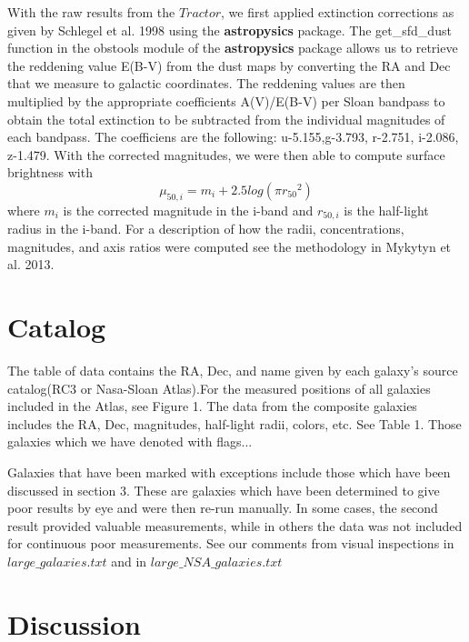 \documentclass[12pt,preprint,pdftex]{aastex}
\begin{document}
With the raw results from the $Tractor$, we first applied extinction corrections as given by Schlegel et al. 1998 using the \textbf{astropysics} package. The get_sfd_dust function in the obstools module of the {\bf astropysics} package allows us to retrieve the reddening value E(B-V) from the dust maps by converting the RA and Dec that we measure to galactic coordinates. The reddening values are then multiplied by the appropriate coefficients A(V)/E(B-V) per Sloan bandpass to obtain the total extinction to be subtracted from the individual magnitudes of each bandpass. The coefficiens are the following: u-5.155,g-3.793, r-2.751, i-2.086, z-1.479. With the corrected magnitudes, we were then able to compute surface brightness with \begin{equation} \mu_{50,i}=m_i+2.5log(\pi{r_{50}}^2) \end{equation} where $m_i$ is the corrected magnitude in the i-band and $r_{50,i}$ is the half-light radius in the i-band. For a description of how the radii, concentrations, magnitudes, and axis ratios were computed see the methodology in Mykytyn et al. 2013. 



\section{Catalog}
The table of data contains the RA, Dec, and name given by each galaxy's source catalog(RC3 or Nasa-Sloan Atlas).For the measured positions of all galaxies included in the Atlas, see Figure 1. The data from the composite galaxies includes the RA, Dec, magnitudes, half-light radii, colors, etc. See Table 1. Those galaxies which we have denoted with flags... 


Galaxies that have been marked with exceptions include those which have been discussed in section 3. These are galaxies which have been determined to give poor results by eye and were then re-run manually. In some cases, the second result provided valuable measurements, while in others the data was not included for continuous poor measurements. See our comments from visual inspections in $large\_galaxies.txt$ and in $large\_NSA\_galaxies.txt$

\section{Discussion}
\end{document}
